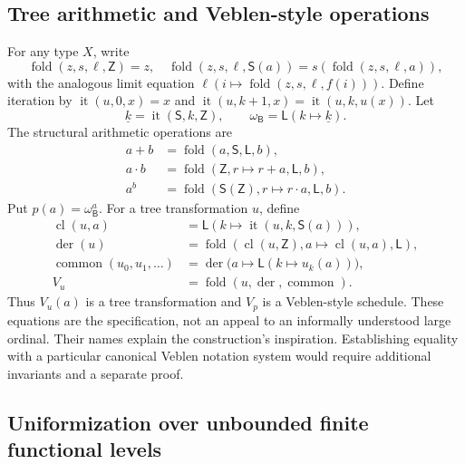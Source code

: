 \documentclass[11pt,a4paper]{article}
\theoremstyle{definition}
\newcommand{\B}{\mathsf B}
\newcommand{\iter}{\operatorname{it}}
\DeclareMathOperator{\cl}{cl}
\DeclareMathOperator{\der}{der}
\begin{document}
\subsection{Tree arithmetic and Veblen-style operations}

For any type \(X\), write
\[
 \operatorname{fold}(z,s,\ell,\mathsf Z)=z,\quad
 \operatorname{fold}(z,s,\ell,\mathsf S(a))
    =s(\operatorname{fold}(z,s,\ell,a)),
\]
with the analogous limit equation
\(\ell(i\mapsto\operatorname{fold}(z,s,\ell,f(i)))\).
Define iteration by
\(\iter(u,0,x)=x\) and
\(\iter(u,k+1,x)=\iter(u,k,u(x))\). Let
\[
 \underline k=\iter(\mathsf S,k,\mathsf Z),\qquad
 \omega_{\B}=\mathsf L(k\mapsto\underline k).
\]
The structural arithmetic operations are
\begin{align*}
 a+b&=\operatorname{fold}(a,\mathsf S,\mathsf L,b),\\
 a\cdot b&=\operatorname{fold}
       (\mathsf Z,r\mapsto r+a,\mathsf L,b),\\
 a^b&=\operatorname{fold}
       (\mathsf S(\mathsf Z),r\mapsto r\cdot a,\mathsf L,b).
\end{align*}
Put \(p(a)=\omega_{\B}^{a}\). For a tree transformation \(u\), define
\begin{align*}
 \cl(u,a)&=\mathsf L(k\mapsto\iter(u,k,\mathsf S(a))),\\
 \der(u)&=\operatorname{fold}
       (\cl(u,\mathsf Z),a\mapsto\cl(u,a),\mathsf L),\\
 \operatorname{common}(u_0,u_1,\ldots)
   &=\der\bigl(a\mapsto\mathsf L(k\mapsto u_k(a))\bigr),\\
 V_u&=\operatorname{fold}(u,\der,\operatorname{common}).
\end{align*}
Thus \(V_u(a)\) is a tree transformation and \(V_p\) is a Veblen-style
schedule. These equations are the specification, not an appeal to an
informally understood large ordinal. Their names explain the construction's
inspiration. Establishing equality with a particular canonical Veblen
notation system would require additional invariants and a separate proof.

\subsection{Uniformization over unbounded finite functional levels}
\end{document}
